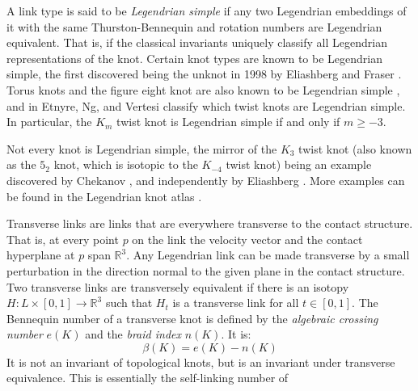 \documentclass{article}
\theoremstyle{plain}
\begin{document}
        A link type is said to be \textit{Legendrian simple} if
        any two Legendrian embeddings of it with the same Thurston-Bennequin
        and rotation numbers are Legendrian equivalent. That is, if the classical
        invariants uniquely classify all Legendrian representations of the knot.
        Certain knot types are known to be Legendrian simple, the first
        discovered being the unknot in 1998
        by Eliashberg and Fraser
        \cite{EliashbergFraserClassificationTopTrivialLegKnots}.
        Torus knots and the figure eight knot are also known to be Legendrian
        simple
        \cite{EtnyreHondaContactTopologyI}, and in
        \cite{EtnyreEtAlLegendrianAndTransverseTwistKnots} Etnyre, Ng, and
        Vertesi classify which twist knots are Legendrian simple. In particular,
        the $K_{m}$ twist knot is Legendrian simple if and only if
        $m\geq{-3}$.
        \par\hfill\par
        Not every knot is Legendrian simple, the mirror of the $K_{3}$ twist
        knot (also known as the $5_{2}$ knot, which is isotopic to the
        $K_{-4}$ twist knot) being an example discovered by Chekanov
        \cite{ChekanovDifAlgOfLegLinks}, and independently by
        Eliashberg \cite{EliashbergInvariantsInContactTopology}.
        More examples can be found in the
        Legendrian knot atlas \cite{LegendrianKnotAtlas}.
        \par\hfill\par
        Transverse links are links that are everywhere transverse to the
        contact structure. That is, at every point $p$ on the link the velocity
        vector and the contact hyperplane at $p$ span $\mathbb{R}^{3}$.
        Any Legendrian
        link can be made transverse by a small perturbation in the direction
        normal to the given plane in the contact structure.
        Two transverse links are transversely equivalent if there is an
        isotopy $H:L\times[0,1]\rightarrow\mathbb{R}^{3}$ such that $H_{t}$ is a
        transverse link for all $t\in[0,1]$. The Bennequin number of a
        transverse knot is defined by the \textit{algebraic crossing number}
        $e(K)$ and the \textit{braid index} $n(K)$. It is:
        \begin{equation}
            \beta(K)=e(K)-n(K)
        \end{equation}
        It is not an invariant of topological knots, but is an invariant under
        transverse equivalence. This is essentially the self-linking number of
\end{document}

